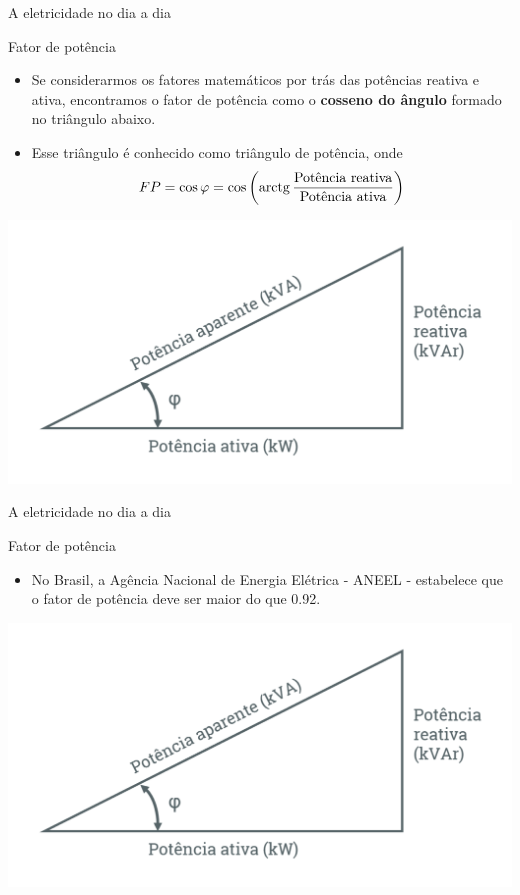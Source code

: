 \begin{frame}{A eletricidade no dia a dia}
	\begin{block}{Fator de potência}
		\begin{itemize}
			\item Se considerarmos os fatores matemáticos por trás das potências reativa e ativa, encontramos o fator de potência como o \textbf{cosseno do ângulo} formado no triângulo abaixo.
			\item Esse triângulo é conhecido como triângulo de potência, onde \[ FP=\cos{\varphi} = \cos{\left( \operatorname{arctg}{\dfrac{\text{Potência reativa}}{\text{Potência ativa}}}\right) } \]
		\end{itemize}
	\end{block}

	\centering
	\includegraphics[width=0.7\linewidth]{Figuras/Ch01/fig13}
\end{frame}


\begin{frame}{A eletricidade no dia a dia}
	\begin{block}{Fator de potência}
		\begin{itemize}
			\item No Brasil, a Agência Nacional de Energia Elétrica - ANEEL - estabelece que o fator de potência deve ser maior do que \num{0,92}.
		\end{itemize}
	\end{block}

	\bigskip

	\centering
	\includegraphics[width=0.7\linewidth]{Figuras/Ch01/fig13}
\end{frame}


